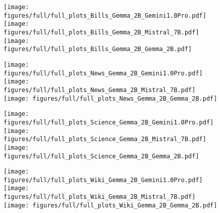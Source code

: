 \begin{figure}[H]
    \centering
    \texttt{[image: figures/full/full\_plots\_Bills\_Gemma\_2B\_Gemini1.0Pro.pdf]}
    \texttt{[image: figures/full/full\_plots\_Bills\_Gemma\_2B\_Mistral\_7B.pdf]}
    \texttt{[image: figures/full/full\_plots\_Bills\_Gemma\_2B\_Gemma\_2B.pdf]}
    \label{fig:full_gemma_bills}
\end{figure}

\begin{figure}[H]
    \centering
    \texttt{[image: figures/full/full\_plots\_News\_Gemma\_2B\_Gemini1.0Pro.pdf]}
    \texttt{[image: figures/full/full\_plots\_News\_Gemma\_2B\_Mistral\_7B.pdf]}
    \texttt{[image: figures/full/full\_plots\_News\_Gemma\_2B\_Gemma\_2B.pdf]}
    \label{fig:full_gemma_news}
\end{figure}

\begin{figure}[H]
    \centering
    \texttt{[image: figures/full/full\_plots\_Science\_Gemma\_2B\_Gemini1.0Pro.pdf]}
    \texttt{[image: figures/full/full\_plots\_Science\_Gemma\_2B\_Mistral\_7B.pdf]}
    \texttt{[image: figures/full/full\_plots\_Science\_Gemma\_2B\_Gemma\_2B.pdf]}
    \label{fig:full_gemma_science}
\end{figure}

\begin{figure}[H]
    \centering
    \texttt{[image: figures/full/full\_plots\_Wiki\_Gemma\_2B\_Gemini1.0Pro.pdf]}
    \texttt{[image: figures/full/full\_plots\_Wiki\_Gemma\_2B\_Mistral\_7B.pdf]}
    \texttt{[image: figures/full/full\_plots\_Wiki\_Gemma\_2B\_Gemma\_2B.pdf]}
    \label{fig:full_gemma_wiki}
\end{figure}